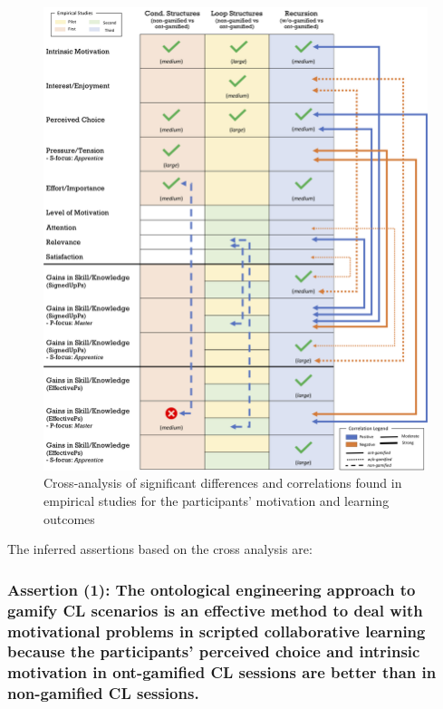 \begin{figure}[htb]
 \caption{Cross-analysis of significant differences and correlations found in empirical studies for the participants' motivation and learning outcomes}
 \label{fig:cross-analysis}
 \centering
 \includegraphics[width=1\textwidth]{images/chap-evaluation/cross-analysis.png}
 \fautor
\end{figure}

The inferred assertions based on the cross analysis are:

\subsubsection*{Assertion (1): The ontological engineering approach to gamify CL scenarios is an effective method to deal with motivational problems in scripted collaborative learning because the participants' perceived choice and intrinsic motivation in ont-gamified CL sessions are better than in non-gamified CL sessions.}

